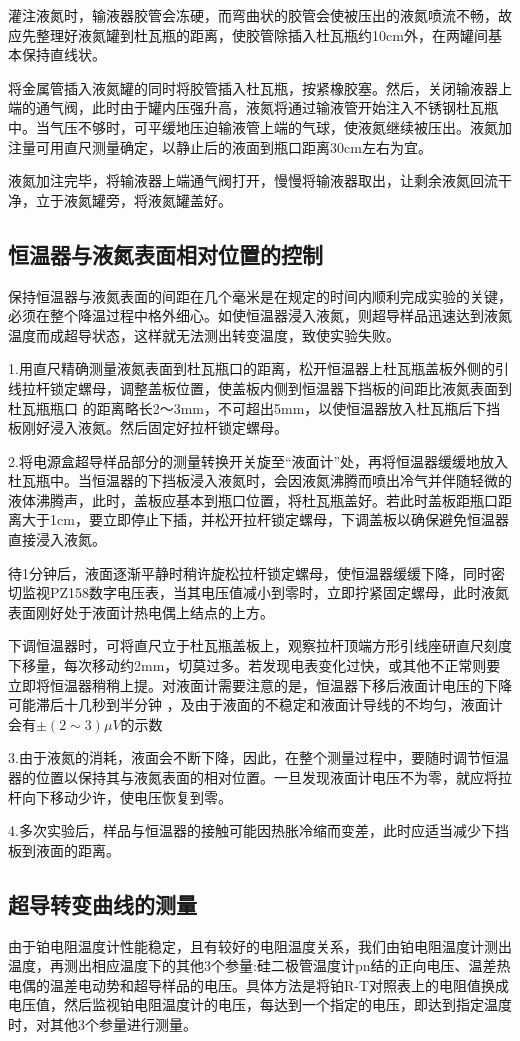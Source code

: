 \documentclass[UTF8]{ctexart}
\begin{document}
\begin{multicols}{2}
灌注液氮时，输液器胶管会冻硬，而弯曲状的胶管会使被压出的液氮喷流不畅，故应先整理好液氮罐到杜瓦瓶的距离，使胶管除插入杜瓦瓶约10cm外，在两罐间基本保持直线状。

将金属管插入液氮罐的同时将胶管插入杜瓦瓶，按紧橡胶塞。然后，关闭输液器上端的通气阀，此时由于罐内压强升高，液氮将通过输液管开始注入不锈钢杜瓦瓶中。当气压不够时，可平缓地压迫输液管上端的气球，使液氮继续被压出。液氮加注量可用直尺测量确定，以静止后的液面到瓶口距离30cm左右为宜。

液氮加注完毕，将输液器上端通气阀打开，慢慢将输液器取出，让剩余液氮回流干净，立于液氮罐旁，将液氮罐盖好。
\subsection{恒温器与液氮表面相对位置的控制}
保持恒温器与液氮表面的间距在几个毫米是在规定的时间内顺利完成实验的关键，必须在整个降温过程中格外细心。如使恒温器浸入液氮，则超导样品迅速达到液氮温度而成超导状态，这样就无法测出转变温度，致使实验失败。

1.用直尺精确测量液氮表面到杜瓦瓶口的距离，松开恒温器上杜瓦瓶盖板外侧的引线拉杆锁定螺母，调整盖板位置，使盖板内侧到恒温器下挡板的间距比液氮表面到杜瓦瓶瓶口
的距离略长2～3mm，不可超出5mm，以使恒温器放入杜瓦瓶后下挡板刚好浸入液氮。然后固定好拉杆锁定螺母。

2.将电源盒超导样品部分的测量转换开关旋至“液面计”处，再将恒温器缓缓地放入杜瓦瓶中。当恒温器的下挡板浸入液氮时，会因液氮沸腾而喷出冷气并伴随轻微的液体沸腾声，此时，盖板应基本到瓶口位置，将杜瓦瓶盖好。若此时盖板距瓶口距离大于1cm，要立即停止下插，并松开拉杆锁定螺母，下调盖板以确保避免恒温器直接浸入液氮。

待1分钟后，液面逐渐平静时稍许旋松拉杆锁定螺母，使恒温器缓缓下降，同时密切监视PZ158数字电压表，当其电压值减小到零时，立即拧紧固定螺母，此时液氮表面刚好处于液面计热电偶上结点的上方。

下调恒温器时，可将直尺立于杜瓦瓶盖板上，观察拉杆顶端方形引线座研直尺刻度下移量，每次移动约2mm，切莫过多。若发现电表变化过快，或其他不正常则要立即将恒温器稍稍上提。对液面计需要注意的是，恒温器下移后液面计电压的下降可能滞后十几秒到半分钟
，及由于液面的不稳定和液面计导线的不均匀，液面计会有$\pm(2 \sim 3) \mu V$的示数

3.由于液氮的消耗，液面会不断下降，因此，在整个测量过程中，要随时调节恒温器的位置以保持其与液氮表面的相对位置。一旦发现液面计电压不为零，就应将拉杆向下移动少许，使电压恢复到零。

4.多次实验后，样品与恒温器的接触可能因热胀冷缩而变差，此时应适当减少下挡板到液面的距离。
\subsection{超导转变曲线的测量}
由于铂电阻温度计性能稳定，且有较好的电阻温度关系，我们由铂电阻温度计测出温度，再测出相应温度下的其他3个参量:硅二极管温度计pn结的正向电压、温差热电偶的温差电动势和超导样品的电压。具体方法是将铂R-T对照表上的电阻值换成电压值，然后监视铂电阻温度计的电压，每达到一个指定的电压，即达到指定温度时，对其他3个参量进行测量。


\end{multicols}
\end{document}
